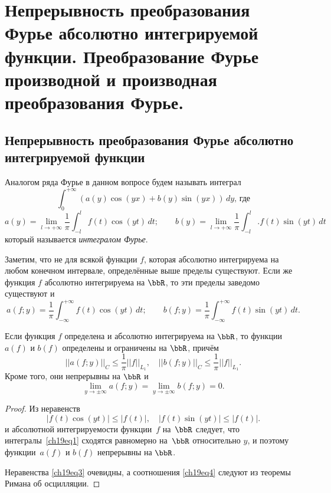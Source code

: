 \chapter{Непрерывность преобразования Фурье абсолютно интегрируемой функции. Преобразование Фурье производной и производная преобразования Фурье.}

\section{Непрерывность преобразования Фурье абсолютно интегрируемой функции}

Аналогом ряда Фурье в данном вопросе будем называть интеграл
$$
\int_{0}^{+\infty} (a(y)\cos(yx) + b(y)\sin(yx))\,dy,\, \text{где}
$$
$$
a(y) = \lim_{l \to +\infty}\frac{1}{\pi}\int_{-l}^{l} f(t)\cos(yt)\,dt;\qquad 
b(y) = \lim_{l \to +\infty}\frac{1}{\pi}\int_{-l}^{l}. f(t)\sin(yt)\,dt
$$
который называется \textit{интегралом Фурье}.

Заметим, что не для всякой функции $f$, которая абсолютно интегрируема на любом конечном интервале, определённые выше пределы существуют. Если же функция $f$ абсолютно интегрируема на $\bbR$, то эти пределы заведомо существуют и
\begin{equation} \label{ch19eq1}
a(f;y) = \frac{1}{\pi}\int_{-\infty}^{+\infty} f(t)\cos(yt)\,dt;
\qquad
b(f;y) = \frac{1}{\pi}\int_{-\infty}^{+\infty} f(t)\sin(yt)\,dt.
\end{equation}

\begin{thm}
Если функция $f$ определена и абсолютно интегрируема на $\bbR$, то функции $a(f)$ и $b(f)$ определены и ограничены на $\bbR$, причём
\begin{equation} \label{ch19eq3}
||a(f;y)||_C \le \frac{1}{\pi}||f||_{L_{1}}, \quad ||b(f;y)||_C \le \frac{1}{\pi}||f||_{L_{1}}.
\end{equation}
Кроме того, они непрерывны на $\bbR$ и
\begin{equation} \label{ch19eq4}
\lim_{y \to \pm\infty} a(f;y) = \lim_{y \to \pm\infty} b(f;y) = 0.
\end{equation}
\end{thm}
\begin{proof}
Из неравенств
$$
|f(t)\cos(yt)| \le |f(t)|, \quad |f(t)\sin(yt)| \le |f(t)|.
$$
и абсолютной интегрируемости функции~$f$ на~$\bbR$ следует, что интегралы~\eqref{ch19eq1} сходятся равномерно на~$\bbR$ относительно $y$, и поэтому функции~$a(f)$ и $b(f)$ непрерывны на $\bbR$.

Неравенства \eqref{ch19eq3} очевидны, а соотношения \eqref{ch19eq4} следуют из теоремы Римана об осцилляции. 
\end{proof}

